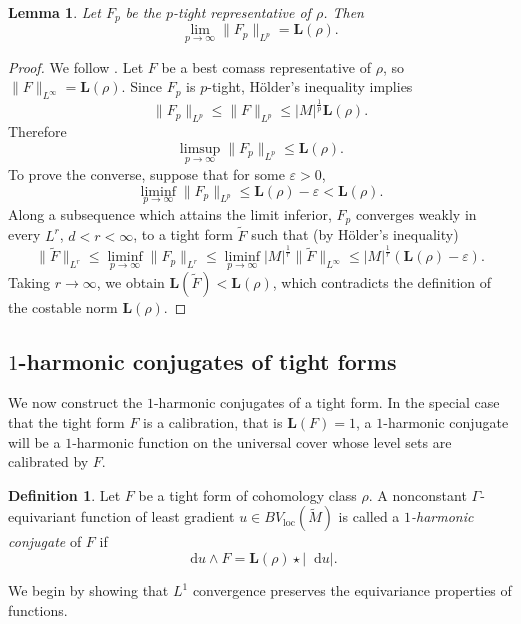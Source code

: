 \documentclass[reqno,11pt]{amsart}
\newcommand*\dif{\mathop{}\!\mathrm{d}}
\newcommand{\Comass}{\mathbf L}
\newcommand{\dfn}[1]{\emph{#1}\index{#1}}
\newcommand{\loc}{\mathrm{loc}}
\newtheorem{lemma}[theorem]{Lemma}
\theoremstyle{definition}
\newtheorem{definition}[theorem]{Definition}
\numberwithin{equation}{section}
\begin{document}
\begin{lemma}\label{p tights approximate L}
Let $F_p$ be the $p$-tight representative of $\rho$. Then 
$$\lim_{p \to \infty} \|F_p\|_{L^p} = \Comass(\rho).$$
\end{lemma}
\begin{proof}
We follow \cite[Lemma 2.7]{daskalopoulos2020transverse}.
Let $F$ be a best comass representative of $\rho$, so $\|F\|_{L^\infty} = \Comass(\rho)$.
Since $F_p$ is $p$-tight, H\"older's inequality implies 
$$\|F_p\|_{L^p} \leq \|F\|_{L^p} \leq |M|^{\frac{1}{p}} \Comass(\rho).$$
Therefore 
$$\limsup_{p \to \infty} \|F_p\|_{L^p} \leq \Comass(\rho).$$
To prove the converse, suppose that for some $\varepsilon > 0$,
$$\liminf_{p \to \infty} \|F_p\|_{L^p} \leq \Comass(\rho) - \varepsilon < \Comass(\rho).$$
Along a subsequence which attains the limit inferior, $F_p$ converges weakly in every $L^r$, $d < r < \infty$, to a tight form $\tilde F$ such that (by H\"older's inequality)
$$\|\tilde F\|_{L^r} \leq \liminf_{p \to \infty} \|F_p\|_{L^r} \leq \liminf_{p \to \infty} |M|^{\frac{1}{r}} \|\tilde F\|_{L^\infty} \leq |M|^{\frac{1}{r}} (\Comass(\rho) - \varepsilon).$$
Taking $r \to \infty$, we obtain $\Comass(\tilde F) < \Comass(\rho)$, which contradicts the definition of the costable norm $\Comass(\rho)$.
\end{proof}


\subsection{\texorpdfstring{$1$-harmonic conjugates of tight forms}{One-harmonic conjugates of tight forms}}
We now construct the $1$-harmonic conjugates of a tight form.
In the special case that the tight form $F$ is a calibration, that is $\Comass(F) = 1$, a $1$-harmonic conjugate will be a $1$-harmonic function on the universal cover whose level sets are calibrated by $F$.

\begin{definition}
Let $F$ be a tight form of cohomology class $\rho$.
A nonconstant $\Gamma$-equivariant function of least gradient $u \in BV_\loc(\tilde M)$ is called a \dfn{$1$-harmonic conjugate} of $F$ if
\begin{equation}\label{1 extremality}
\dif u \wedge F = \Comass(\rho) \star |\dif u|.
\end{equation}
\end{definition}

We begin by showing that $L^1$ convergence preserves the equivariance properties of functions.
\end{document}
